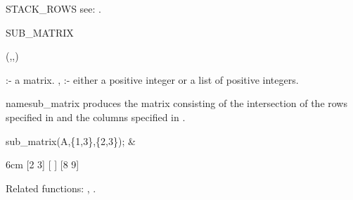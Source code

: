 \begin{Operator}[stackrows]{STACK_ROWS}
see:  .
\end{Operator}


\begin{Operator}[submatrix]{SUB_MATRIX}

\begin{Syntax}
(,,)
\end{Syntax}

                         :- a matrix. 
,  :- either a positive integer or a
                                         list of positive integers.

name{sub\_matrix} produces the matrix consisting of the intersection of
the rows specified in  and the columns specified in 
. 


\begin{Examples}

sub_matrix(A,\{1,3\},\{2,3\}); &
\begin{multilineoutput}{6cm}
[2  3]
[    ]
[8  9]
\end{multilineoutput}

\end{Examples}

Related functions:
, .

\end{Operator}


